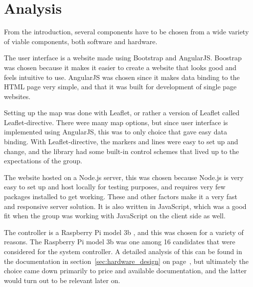 \chapter{Analysis}

From the introduction, several components have to be chosen from a wide variety of viable components, both software and hardware.

The user interface is a website made using Bootstrap\cite{bootstrap} and AngularJS\cite{angular}. 
Boostrap was chosen because it makes it easier to create a website that looks good and feels intuitive to use.
AngularJS was chosen since it makes data binding to the HTML page very simple, and that it was built for development of single page websites.

Setting up the map was done with Leaflet, or rather a version of Leaflet called Leaflet-directive\cite{leaflet}. There were many map options, but since user interface is implemented using AngularJS, this was to only choice that gave easy data binding. With Leaflet-directive, the markers and lines were easy to set up and change, and the library had some built-in control schemes that lived up to the expectations of the group.

The website hosted on a Node.js server\cite{nodejs}, this was chosen because Node.js is very easy to set up and host locally for testing purposes, and requires very few packages installed to get working. These and other factors make it a very fast and responsive server solution\cite{NodeJS_fast}. It is also written in JavaScript\cite{javascript}, which was a good fit when the group was working with JavaScript on the client side as well.

The controller is a Raspberry Pi model 3b \cite{rpi}, and this was chosen for a variety of reasons. The Raspberry Pi model 3b was one among 16 candidates that were considered for the system controller. A detailed analysis of this can be found in the documentation in section~\ref{sec:hardware_design} on page~\pageref{sec:hardware_design}, but ultimately the choice came down primarily to price and available documentation, and the latter would turn out to be relevant later on.

